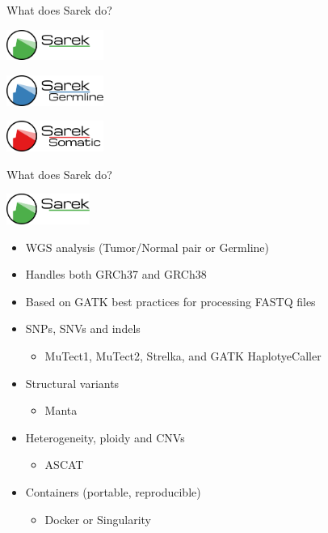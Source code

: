 \documentclass{beamer}
\begin{document}
\begin{frame}{What does Sarek do?}
	\begin{center}
		\includegraphics[height=1cm]{pictures/Sarek}
	\end{center}
	\pause
	\begin{center}
		\includegraphics[height=1cm]{pictures/Sarek_germline}
	\end{center}
	\pause
	\begin{center}
		\includegraphics[height=1cm]{pictures/Sarek_somatic}
	\end{center}
\end{frame}

\begin{frame}{What does Sarek do?}
	\begin{center}
		\includegraphics[height=1cm]{pictures/Sarek_no_border}
	\end{center}
	\pause
	\begin{itemize}
		\item WGS analysis (Tumor/Normal pair or Germline)
		\pause
		\item Handles both GRCh37 and GRCh38
		\pause
		\item Based on GATK best practices for processing FASTQ files
		\pause
		\item<5-> SNPs, SNVs and indels
		\begin{itemize}
			\item<6-> MuTect1, MuTect2, Strelka, and GATK HaplotyeCaller
		\end{itemize}
		\pause
		\item<7-> Structural variants
		\begin{itemize}
			\item<8-> Manta
		\end{itemize}
		\pause
		\item<9-> Heterogeneity, ploidy and CNVs
		\begin{itemize}
			\item<10-> ASCAT
		\end{itemize}
		\pause
		\item<11-> Containers (portable, reproducible)
		\begin{itemize}
			\item<12-> Docker or Singularity
		\end{itemize}
	\end{itemize}
\end{frame}
\end{document}
